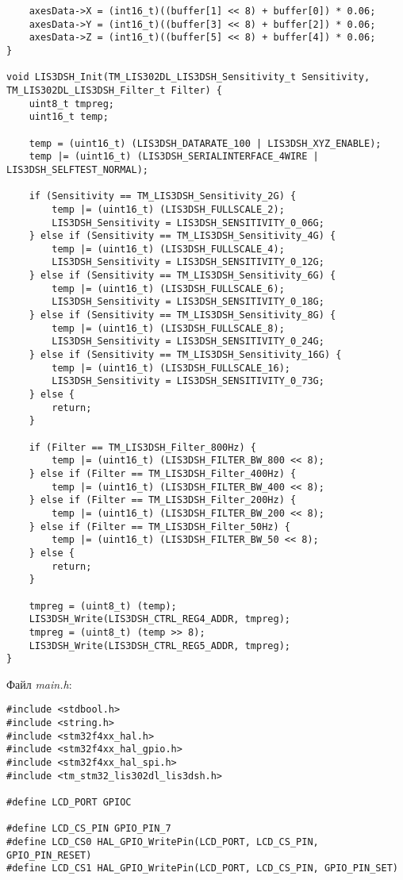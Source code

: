 \documentclass[oneside,14pt]{extarticle}
\begin{document}
\begin{normalsize}
{\begin{lstlisting}
	axesData->X = (int16_t)((buffer[1] << 8) + buffer[0]) * 0.06;
	axesData->Y = (int16_t)((buffer[3] << 8) + buffer[2]) * 0.06;
	axesData->Z = (int16_t)((buffer[5] << 8) + buffer[4]) * 0.06;
}

void LIS3DSH_Init(TM_LIS302DL_LIS3DSH_Sensitivity_t Sensitivity, TM_LIS302DL_LIS3DSH_Filter_t Filter) {
	uint8_t tmpreg;
	uint16_t temp;

	temp = (uint16_t) (LIS3DSH_DATARATE_100 | LIS3DSH_XYZ_ENABLE);
	temp |= (uint16_t) (LIS3DSH_SERIALINTERFACE_4WIRE | LIS3DSH_SELFTEST_NORMAL);
	
	if (Sensitivity == TM_LIS3DSH_Sensitivity_2G) {
		temp |= (uint16_t) (LIS3DSH_FULLSCALE_2);
		LIS3DSH_Sensitivity = LIS3DSH_SENSITIVITY_0_06G;
	} else if (Sensitivity == TM_LIS3DSH_Sensitivity_4G) {
		temp |= (uint16_t) (LIS3DSH_FULLSCALE_4);
		LIS3DSH_Sensitivity = LIS3DSH_SENSITIVITY_0_12G;
	} else if (Sensitivity == TM_LIS3DSH_Sensitivity_6G) {
		temp |= (uint16_t) (LIS3DSH_FULLSCALE_6);
		LIS3DSH_Sensitivity = LIS3DSH_SENSITIVITY_0_18G;
	} else if (Sensitivity == TM_LIS3DSH_Sensitivity_8G) {
		temp |= (uint16_t) (LIS3DSH_FULLSCALE_8);
		LIS3DSH_Sensitivity = LIS3DSH_SENSITIVITY_0_24G;
	} else if (Sensitivity == TM_LIS3DSH_Sensitivity_16G) {
		temp |= (uint16_t) (LIS3DSH_FULLSCALE_16);
		LIS3DSH_Sensitivity = LIS3DSH_SENSITIVITY_0_73G;
	} else {
		return;
	}
	
	if (Filter == TM_LIS3DSH_Filter_800Hz) {
		temp |= (uint16_t) (LIS3DSH_FILTER_BW_800 << 8);
	} else if (Filter == TM_LIS3DSH_Filter_400Hz) {
		temp |= (uint16_t) (LIS3DSH_FILTER_BW_400 << 8);
	} else if (Filter == TM_LIS3DSH_Filter_200Hz) {
		temp |= (uint16_t) (LIS3DSH_FILTER_BW_200 << 8);
	} else if (Filter == TM_LIS3DSH_Filter_50Hz) {
		temp |= (uint16_t) (LIS3DSH_FILTER_BW_50 << 8);
	} else {
		return;
	}
	
	tmpreg = (uint8_t) (temp);
	LIS3DSH_Write(LIS3DSH_CTRL_REG4_ADDR, tmpreg);
	tmpreg = (uint8_t) (temp >> 8);
	LIS3DSH_Write(LIS3DSH_CTRL_REG5_ADDR, tmpreg);
}
		\end{lstlisting}
	}
	
	Файл \textit{main.h}:
	{\small
		\begin{lstlisting}
#include <stdbool.h>
#include <string.h>
#include <stm32f4xx_hal.h>
#include <stm32f4xx_hal_gpio.h>
#include <stm32f4xx_hal_spi.h>
#include <tm_stm32_lis302dl_lis3dsh.h>

#define LCD_PORT GPIOC

#define LCD_CS_PIN GPIO_PIN_7
#define LCD_CS0 HAL_GPIO_WritePin(LCD_PORT, LCD_CS_PIN, GPIO_PIN_RESET)
#define LCD_CS1 HAL_GPIO_WritePin(LCD_PORT, LCD_CS_PIN, GPIO_PIN_SET)


\end{lstlisting}}
\end{normalsize}
\end{document}
